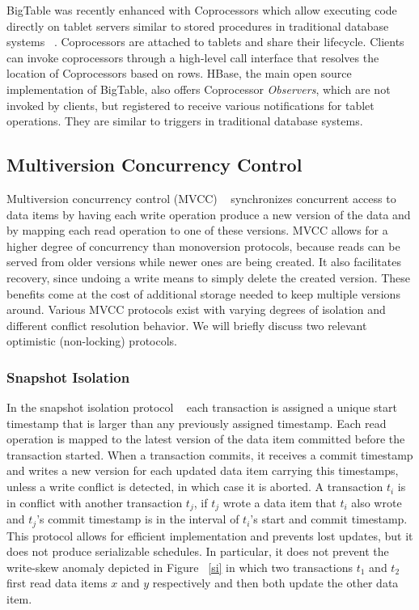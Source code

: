 \documentclass[10pt,final,journal]{IEEEtran}
\begin{document}
BigTable was recently enhanced with Coprocessors which allow executing code directly on tablet servers similar to stored procedures in traditional database systems ~\cite{Dean:2009}. Coprocessors are attached to tablets and share their lifecycle. Clients can invoke coprocessors through a high-level call interface that resolves the location of Coprocessors based on rows. HBase, the main open source implementation of BigTable, also offers Coprocessor \emph{Observers}, which are not invoked by clients, but registered to receive various notifications for tablet operations. They are similar to triggers in traditional database systems.

\subsection{Multiversion Concurrency Control}
Multiversion concurrency control (MVCC) ~\cite{Bernstein:1983:MCC:319996.319998} synchronizes concurrent access to data items by having each write operation produce a new version of the data and by mapping each read operation to one of these versions. MVCC allows for a higher degree of concurrency than monoversion protocols, because reads can be served from older versions while newer ones are being created. It also facilitates recovery, since undoing a write means to simply delete the created version. These benefits come at the cost of additional storage needed to keep multiple versions around. Various MVCC protocols exist with varying degrees of isolation and different conflict resolution behavior. We will briefly discuss two relevant optimistic (non-locking) protocols.

\subsubsection{Snapshot Isolation}
In the snapshot isolation protocol ~\cite{Berenson:1995:CAS:568271.223785} each transaction is assigned a unique start timestamp that is larger than any previously assigned timestamp. Each read operation is mapped to the latest version of the data item committed before the transaction started. When a transaction commits, it receives a commit timestamp and writes a new version for each updated data item carrying this timestamps, unless a write conflict is detected, in which case it is aborted. A transaction $t_i$ is in conflict with another transaction $t_j$, if $t_j$ wrote a data item that $t_i$ also wrote and $t_j$'s commit timestamp is in the interval of $t_i$'s start and commit timestamp. This protocol allows for efficient implementation and prevents lost updates, but it does not produce serializable schedules. In particular, it does not prevent the write-skew anomaly depicted in Figure ~\ref{si} in which two transactions $t_1$ and $t_2$ first read data items $x$ and $y$ respectively and then both update the other data item.
\end{document}

